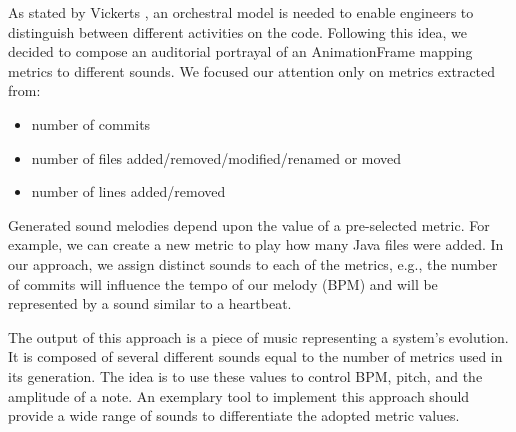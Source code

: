 As stated by Vickerts \cite{Vickers2004}, an orchestral model is needed to enable engineers to distinguish between different activities on the code. Following this idea, we decided to compose an auditorial portrayal of an  AnimationFrame mapping metrics to different sounds. We focused our attention only on metrics extracted from:
\begin{itemize}
    \item number of commits
    \item number of files added/removed/modified/renamed or moved
    \item number of lines added/removed
\end{itemize}

Generated sound melodies depend upon the value of a pre-selected metric. For example, we can create a new metric to play how many Java files were added. In our approach, we assign distinct sounds to each of the metrics, e.g., the number of commits will influence the tempo of our melody (BPM) and will be represented by a sound similar to a heartbeat.

The output of this approach is a piece of music representing a system's evolution. It is composed of several different sounds equal to the number of metrics used in its generation. The idea is to use these values to control BPM, pitch, and the amplitude of a note. 
An exemplary tool to implement this approach should provide a wide range of sounds to differentiate the adopted metric values. 










